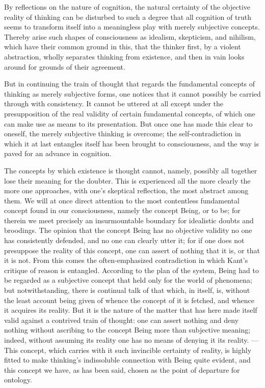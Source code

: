 \documentclass[12pt]{article}
\newcommand{\opage}[1]{\marginnote{\footnotesize\textit{[#1]}}}
\begin{document}
By reflections on the nature of cognition, the natural certainty of the objective
reality of thinking can be disturbed to such a degree that all cognition of truth
seems to transform itself into a meaningless play with merely subjective concepts.
Thereby arise such shapes of consciousness as idealism, skepticism, and nihilism,
which have their common ground in this, that the thinker first, by a violent
abstraction, wholly separates thinking from existence, and then in vain looks
around for grounds of their agreement.

But in continuing the train of thought that regards the fundamental concepts of
thinking as merely subjective forms, one notices that it cannot possibly be carried
through with consistency. It cannot be uttered at all except under the
presupposition of the real validity of certain fundamental concepts, of which one
can make use as means to its presentation. But once one has made this clear to
oneself, the merely subjective thinking is overcome; the self-contradiction in
which it at last entangles itself has been brought to consciousness, and the way is
paved for an advance in cognition.

The concepts by which existence is thought cannot, namely, \opage{207}possibly all
together lose their meaning for the doubter. This is experienced all the more
clearly the more one approaches, with one's skeptical reflection, the most abstract
among them. We will at once direct attention to the most contentless fundamental
concept found in our consciousness, namely the concept Being, or to be; for therein
we meet precisely an insurmountable boundary for idealistic doubts and broodings.
The opinion that the concept Being has no objective validity no one has consistently
defended, and no one can clearly utter it; for if one does not presuppose the reality
of this concept, one can assert of nothing that it is, or that it is not. From this
comes the often-emphasized contradiction in which Kant's critique of reason is
entangled. According to the plan of the system, Being had to be regarded as a
subjective concept that held only for the world of phenomena; but notwithstanding,
there is continual talk of that which, in itself, is, without the least account
being given of whence the concept of it is fetched, and whence it acquires its
reality. But it is the nature of the matter that has here made itself valid against
a contrived train of thought: one can assert nothing and deny nothing without
ascribing to the concept Being more than subjective meaning; indeed, without
assuming its reality one has no means of denying it its reality. --- This concept,
which carries with it such invincible certainty of reality, is highly fitted to make
thinking's indissoluble connection with Being quite evident, and this concept we
have, as has been said, chosen as the point of departure for ontology.
\end{document}
